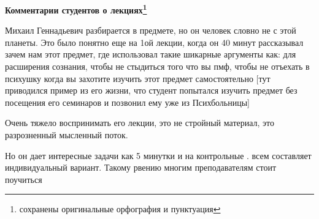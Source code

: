 		\textbf{Комментарии студентов о лекциях\protect\footnote{сохранены оригинальные орфография и пунктуация}}
            \begin{commentbox} 
                Михаил Геннадьевич разбирается в предмете, но он человек словно не с этой планеты. Это было понятно еще на 1ой лекции, когда он 40 минут рассказывал зачем нам этот предмет, где использовал такие шикарные аргументы как: для расширения сознания, чтобы не стыдиться того что вы пмф, чтобы не отъехать в психушку когда вы захотите изучить этот предмет самостоятельно [тут приводился пример из его жизни, что студент попытался изучить предмет без посещения его семинаров и позвонил ему уже из Психбольницы]
        
                Очень тяжело воспринимать его лекции, это не стройный материал, это разрозненный мысленный поток. 
        
                Но он дает интересные задачи как 5 минутки и на контрольные . всем составляет индивидуальный вариант. Такому рвению многим преподавателям стоит поучиться 
            \end{commentbox}    
    
    
